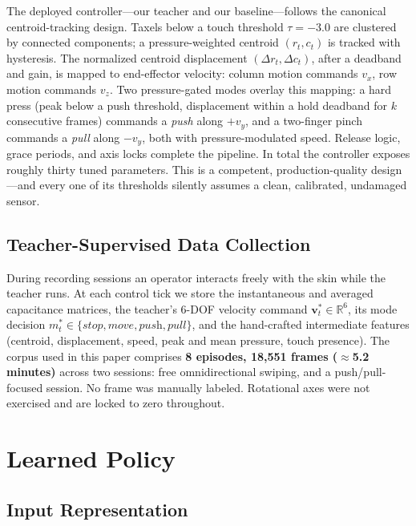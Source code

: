\documentclass[runningheads]{llncs}
\begin{document}
The deployed controller---our teacher and our baseline---follows the
canonical centroid-tracking design.  Taxels below a touch threshold
$\tau=-3.0$ are clustered by connected components; a pressure-weighted
centroid $(r_t, c_t)$ is tracked with hysteresis.  The normalized centroid
displacement $(\Delta r_t, \Delta c_t)$, after a deadband and gain, is
mapped to end-effector velocity: column motion commands $v_x$, row motion
commands $v_z$.  Two pressure-gated modes overlay this mapping: a hard
press (peak below a push threshold, displacement within a hold deadband
for $k$ consecutive frames) commands a \emph{push} along $+v_y$, and a
two-finger pinch commands a \emph{pull} along $-v_y$, both with
pressure-modulated speed.  Release logic, grace periods, and axis locks
complete the pipeline.  In total the controller exposes roughly thirty
tuned parameters.  This is a competent, production-quality design---and
every one of its thresholds silently assumes a clean, calibrated,
undamaged sensor.

\subsection{Teacher-Supervised Data Collection}

During recording sessions an operator interacts freely with the skin while
the teacher runs.  At each control tick we store the instantaneous and
averaged capacitance matrices, the teacher's 6-DOF velocity command
$\mathbf{v}_t^\ast \in \mathbb{R}^6$, its mode decision
$m_t^\ast \in \{\textit{stop}, \textit{move}, \textit{push},
\textit{pull}\}$, and the hand-crafted intermediate features (centroid,
displacement, speed, peak and mean pressure, touch presence).  The corpus
used in this paper comprises \textbf{8 episodes, 18{,}551 frames
($\approx$5.2 minutes)} across two sessions: free omnidirectional swiping,
and a push/pull-focused session.  No frame was manually labeled.
Rotational axes were not exercised and are locked to zero throughout.

\section{Learned Policy}
\label{sec:method}

\subsection{Input Representation}
\end{document}
